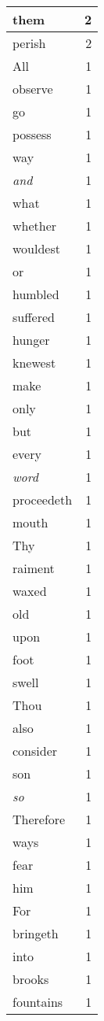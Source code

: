 \begin{center}
\begin{longtable}{l|r}
them & 2 \\ \hline
perish & 2 \\ \hline
All & 1 \\ \hline
observe & 1 \\ \hline
go & 1 \\ \hline
possess & 1 \\ \hline
way & 1 \\ \hline
\emph{and} & 1 \\ \hline
what & 1 \\ \hline
whether & 1 \\ \hline
wouldest & 1 \\ \hline
or & 1 \\ \hline
humbled & 1 \\ \hline
suffered & 1 \\ \hline
hunger & 1 \\ \hline
knewest & 1 \\ \hline
make & 1 \\ \hline
only & 1 \\ \hline
but & 1 \\ \hline
every & 1 \\ \hline
\emph{word} & 1 \\ \hline
proceedeth & 1 \\ \hline
mouth & 1 \\ \hline
Thy & 1 \\ \hline
raiment & 1 \\ \hline
waxed & 1 \\ \hline
old & 1 \\ \hline
upon & 1 \\ \hline
foot & 1 \\ \hline
swell & 1 \\ \hline
Thou & 1 \\ \hline
also & 1 \\ \hline
consider & 1 \\ \hline
son & 1 \\ \hline
\emph{so} & 1 \\ \hline
Therefore & 1 \\ \hline
ways & 1 \\ \hline
fear & 1 \\ \hline
him & 1 \\ \hline
For & 1 \\ \hline
bringeth & 1 \\ \hline
into & 1 \\ \hline
brooks & 1 \\ \hline
fountains & 1 \\ \hline

\end{longtable}
\end{center}

